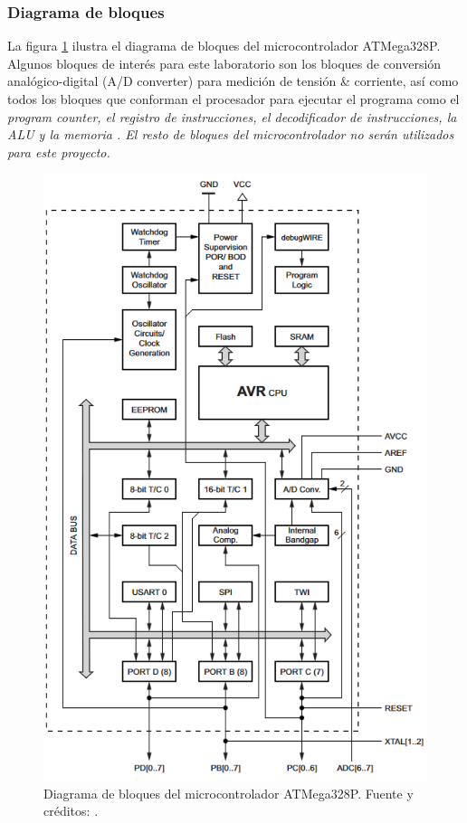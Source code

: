 \subsubsection{Diagrama de bloques}
La figura \ref{mcu-diagram} ilustra el diagrama de bloques del microcontrolador ATMega328P. Algunos bloques de interés para este laboratorio son los bloques de conversión analógico-digital (A/D converter) para medición de tensión \& corriente, así como todos los bloques que conforman el procesador para ejecutar el programa como el \it{program counter}, el registro de instrucciones, el decodificador de instrucciones, la ALU y la memoria \cite{datasheet, atmega}. El resto de bloques del microcontrolador no serán utilizados para este proyecto.
\begin{figure}[H]
    \centering
    \includegraphics[width=14cm]{Imagenes/mcu-diagram.png}
    \caption{Diagrama de bloques del microcontrolador ATMega328P. Fuente y créditos: \cite{atmega}.}
    \label{mcu-diagram}
\end{figure}


